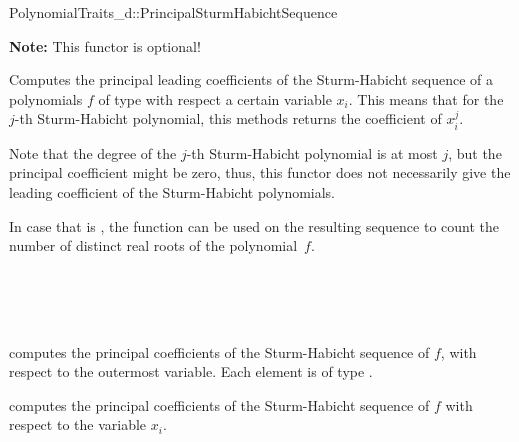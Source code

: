 \begin{ccRefConcept}{PolynomialTraits_d::PrincipalSturmHabichtSequence}

\textbf{Note:} This functor is optional!

\ccDefinition

Computes the principal leading coefficients of the Sturm-Habicht sequence 
of a polynomials $f$ of type  
with respect a certain variable $x_i$.
This means that for the $j$-th Sturm-Habicht polynomial, this methods returns
the coefficient of $x_i^j$. 

Note that the degree of the $j$-th Sturm-Habicht polynomial is at most $j$,
but the principal coefficient might be zero, thus, this functor does not
necessarily give the leading coefficient of the Sturm-Habicht polynomials.

In case that  is , the function  can be used
on the resulting sequence to count the number of distinct real roots of
the polynomial~$f$.

\ccRefines 
{}\\
\\
\\


\ccOperations
{}
         { computes the principal coefficients of the 
           Sturm-Habicht sequence of $f$, 
           with respect to the outermost variable. Each element is of type
           .}

         { computes the principal coefficients 
           of the Sturm-Habicht sequence of $f$ 
           with respect to the variable $x_i$.}


\ccSeeAlso

\\
\\
\\
\\
\\
\\

\end{ccRefConcept}
